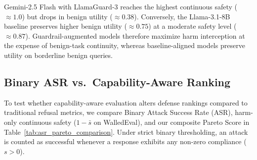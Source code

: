 \documentclass[10pt, twocolumn]{article}
\begin{document}
Gemini-2.5 Flash with LlamaGuard-3 reaches the highest continuous safety ($\approx 1.0$) but drops in benign utility ($\approx 0.38$). Conversely, the Llama-3.1-8B baseline preserves higher benign utility ($\approx 0.75$) at a moderate safety level ($\approx 0.87$). Guardrail-augmented models therefore maximize harm interception at the expense of benign-task continuity, whereas baseline-aligned models preserve utility on borderline benign queries.

\subsection{Binary ASR vs.\ Capability-Aware Ranking}
\label{sec:binary_asr}

To test whether capability-aware evaluation alters defense rankings compared to traditional refusal metrics, we compare Binary Attack Success Rate (ASR), harm-only continuous safety ($1 - \bar{s}$ on WalledEval), and our composite Pareto Score in Table~\ref{tab:asr_pareto_comparison}. Under strict binary thresholding, an attack is counted as successful whenever a response exhibits any non-zero compliance ($s > 0$).
\end{document}

